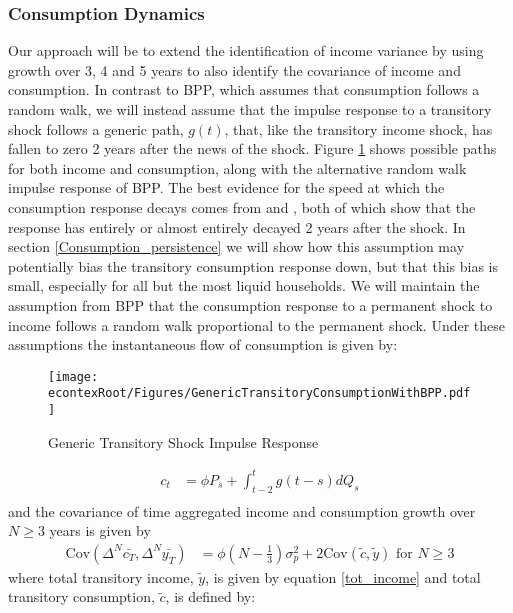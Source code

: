 \documentclass[titlepage]{\econtex}\newcommand{\texname}{ConsumptionHeterogeneity}
\begin{document}
\subsubsection{Consumption Dynamics} \label{cons_dynamics}
Our approach will be to extend the identification of income variance by using growth over 3, 4 and 5 years to also identify the covariance of income and consumption. In contrast to BPP, which assumes that consumption follows a random walk, we will instead assume that the impulse response to a transitory shock follows a generic path, $g(t)$, that, like the transitory income shock, has fallen to zero 2 years after the news of the shock. Figure \ref{fig:GenericTransitoryBPP} shows possible paths for both income and consumption, along with the alternative random walk impulse response of BPP. The best evidence for the speed at which the consumption response decays comes from \cite{gelman_what_2016} and \cite{fagereng_mpc_2016}, both of which show that the response has entirely or almost entirely decayed 2 years after the shock. In section \ref{Consumption_persistence} we will show how this assumption may potentially bias the transitory consumption response down, but that this bias is small, especially for all but the most liquid households. We will maintain the assumption from BPP that the consumption response to a permanent shock to income follows a random walk proportional to the permanent shock. Under these assumptions the instantaneous flow of consumption is given by:	\begin{figure} 
	\begin{centering}
		\texttt{[image: \\econtexRoot/Figures/GenericTransitoryConsumptionWithBPP.pdf]} 
		\caption{Generic Transitory Shock Impulse Response}
		\label{fig:GenericTransitoryBPP}
	\end{centering}
\end{figure}
\begin{align*}
c_t  &= \phi P_s  + \int_{t-2}^{t} g(t-s)dQ_s  \\
\end{align*}
and the covariance of time aggregated income and consumption growth over $N \geq 3$ years is given by
\begin{align}
\mathrm{Cov}(\Delta^N \bar{c_T},\Delta^N \bar{y_T} ) &= \phi (N-\frac{1}{3}) \sigma^2_p + 2 \mathrm{Cov}(\tilde{c},\tilde{y}) \text{  for  } N\geq 3 \label{covariance}
\end{align}
where total transitory income, $\tilde{y}$, is given by equation \ref{tot_income} and total transitory consumption, $\tilde{c}$, is defined by:
\end{document}
